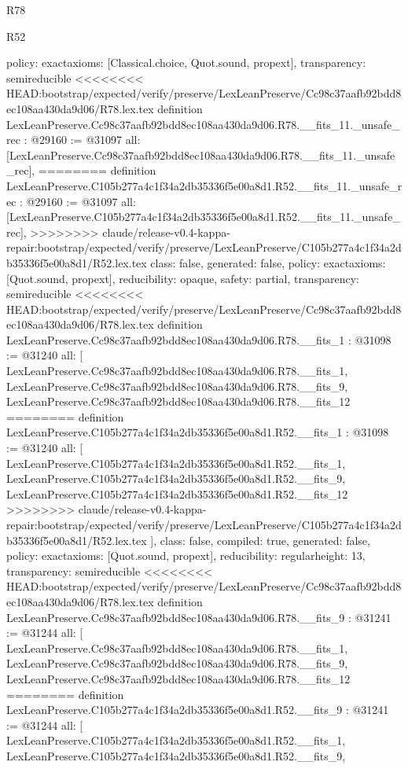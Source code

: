 \begin{lexlean}{R78}
\begin{lexlean}{R52}
\begin{coremodule}
{{{{{{{{{{{{{{{{{{{{{{{{{{{{{{{{{{{{{{{{{{{{{{{{{{{{{{{{{{{{{{{{{{{{{{{{{{{{{{{{{{{{{{{{{{{{{{{{{{{{{{{{{{{{{{{{{{{{{{{{{{{{{{{{{{{{{{{{{{{{{{{{{{{{  policy: exact{axioms: [Classical.choice, Quot.sound, propext]},
  transparency: semireducible
}
<<<<<<<< HEAD:bootstrap/expected/verify/preserve/LexLeanPreserve/Cc98c37aafb92bdd8ec108aa430da9d06/R78.lex.tex
definition LexLeanPreserve.Cc98c37aafb92bdd8ec108aa430da9d06.R78.__fits_11._unsafe_rec : @29160 := @31097 {
  all: [LexLeanPreserve.Cc98c37aafb92bdd8ec108aa430da9d06.R78.__fits_11._unsafe_rec],
========
definition LexLeanPreserve.C105b277a4c1f34a2db35336f5e00a8d1.R52.__fits_11._unsafe_rec : @29160 := @31097 {
  all: [LexLeanPreserve.C105b277a4c1f34a2db35336f5e00a8d1.R52.__fits_11._unsafe_rec],
>>>>>>>> claude/release-v0.4-kappa-repair:bootstrap/expected/verify/preserve/LexLeanPreserve/C105b277a4c1f34a2db35336f5e00a8d1/R52.lex.tex
  class: false,
  generated: false,
  policy: exact{axioms: [Quot.sound, propext]},
  reducibility: opaque{},
  safety: partial,
  transparency: semireducible
}
<<<<<<<< HEAD:bootstrap/expected/verify/preserve/LexLeanPreserve/Cc98c37aafb92bdd8ec108aa430da9d06/R78.lex.tex
definition LexLeanPreserve.Cc98c37aafb92bdd8ec108aa430da9d06.R78.__fits_1 : @31098 := @31240 {
  all: [
    LexLeanPreserve.Cc98c37aafb92bdd8ec108aa430da9d06.R78.__fits_1,
    LexLeanPreserve.Cc98c37aafb92bdd8ec108aa430da9d06.R78.__fits_9,
    LexLeanPreserve.Cc98c37aafb92bdd8ec108aa430da9d06.R78.__fits_12
========
definition LexLeanPreserve.C105b277a4c1f34a2db35336f5e00a8d1.R52.__fits_1 : @31098 := @31240 {
  all: [
    LexLeanPreserve.C105b277a4c1f34a2db35336f5e00a8d1.R52.__fits_1,
    LexLeanPreserve.C105b277a4c1f34a2db35336f5e00a8d1.R52.__fits_9,
    LexLeanPreserve.C105b277a4c1f34a2db35336f5e00a8d1.R52.__fits_12
>>>>>>>> claude/release-v0.4-kappa-repair:bootstrap/expected/verify/preserve/LexLeanPreserve/C105b277a4c1f34a2db35336f5e00a8d1/R52.lex.tex
  ],
  class: false,
  compiled: true,
  generated: false,
  policy: exact{axioms: [Quot.sound, propext]},
  reducibility: regular{height: 13},
  transparency: semireducible
}
<<<<<<<< HEAD:bootstrap/expected/verify/preserve/LexLeanPreserve/Cc98c37aafb92bdd8ec108aa430da9d06/R78.lex.tex
definition LexLeanPreserve.Cc98c37aafb92bdd8ec108aa430da9d06.R78.__fits_9 : @31241 := @31244 {
  all: [
    LexLeanPreserve.Cc98c37aafb92bdd8ec108aa430da9d06.R78.__fits_1,
    LexLeanPreserve.Cc98c37aafb92bdd8ec108aa430da9d06.R78.__fits_9,
    LexLeanPreserve.Cc98c37aafb92bdd8ec108aa430da9d06.R78.__fits_12
========
definition LexLeanPreserve.C105b277a4c1f34a2db35336f5e00a8d1.R52.__fits_9 : @31241 := @31244 {
  all: [
    LexLeanPreserve.C105b277a4c1f34a2db35336f5e00a8d1.R52.__fits_1,
    LexLeanPreserve.C105b277a4c1f34a2db35336f5e00a8d1.R52.__fits_9,
}}}}}}}}}}}}}}}}}}}}}}}}}}}}}}}}}}}}}}}}}}}}}}}}}}}}}}}}}}}}}}}}}}}}}}}}}}}}}}}}}}}}}}}}}}}}}}}}}}}}}}}}}}}}}}}}}}}}}}}}}}}}}}}}}}}}}}}}}}}}}}}}}}}}}}}
\end{coremodule}
\end{lexlean}
\end{lexlean}
